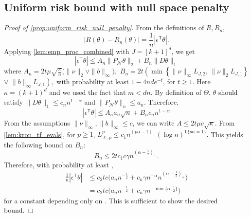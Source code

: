 \documentclass[ejs,noshowframe]{imsart}
\theoremstyle{plain}
\theoremstyle{definition}
\newcommand{\cN}{\mathcal{N}}
\renewcommand{\top}{\mathsf{T}}
\begin{document}
\begin{appendix}
\subsection{Uniform risk bound with null space penalty}
\label{sec:app-uniform_risk_null_penalty}

\begin{proof}[Proof of \autoref{prop:uniform_risk_null_penalty}]
From the definitions of $R, R_n$, 
\begin{equation*}
|R(\theta) - R_n(\theta)| = \frac{1}{n} | \epsilon^\top \theta |.
\end{equation*}
Applying \autoref{lem:emp_proc_combined} with $J = [k+1]^d$, we get
\begin{equation*}
| \epsilon^\top \theta | \leq  A_n \|P_\cN \theta \|_2 + B_n\| D \theta \|_1 
\end{equation*}
where 
$A_n = 2t\mu \sqrt{\frac{\kappa}{n}} \big( \| \nu \|_2 \vee \|b\|_\infty\big),$
$B_n = 2t\left(\min\left\{ \|\nu\|_\infty  L_{J,2}\right.\right.$, 
$\left.\|\nu\|_2 L_{J,1} \right\}$ $\vee$
$\left.\| b \|_\infty L_{J,1}\right),$
with probability at least $1- 4nd e^{-t}$, for $t\ge 1$.
Here $\kappa = (k+1)^d$ and we used the fact that $m < dn$.
By definition of $\Theta$, $\theta$ should satisfy $\|D\theta\|_1 \le c_n 
n^{1-\alpha}$
 and $\|P_\cN \theta\|_n \le a_n$.
Therefore,
\begin{equation}
| \epsilon^\top \theta | \leq 
A_n a_n \sqrt{n} + B_n c_n n^{1-\alpha}
\end{equation}
From the assumptions $\| \nu \|_\infty, \|b\|_\infty \leq c$, we can write 
$A \leq 2 t \mu c \sqrt{\kappa}.$
From \autoref{lem:kron_tf_evals}, for $p\geq 1$,
$
L_{\ell,p}^p \leq c_1 n^{ (p\alpha - 1)_+} (\log n)^{\mathbf{1} \{p\alpha=1\} 
}.
$
This yields the following bound on $B_n:$
\begin{equation}
B_n \leq 2 t c_1 c\gamma n^{(\alpha - \frac{1}{2} )_+}.
\end{equation}
Therefore, with probability at least ,
\begin{align*}
\frac{1}{n}| \epsilon^\top \theta | 
&\leq 
c_2 t c \big( a_n n^{-\frac{1}{2}} + 
	c_n \gamma n^{-\alpha} n^{(\alpha - \frac{1}{2} )_+}  \big)\\
&= c_2 t c \big( a_n n^{-\frac{1}{2}} + 
	c_n \gamma n^{-\min\{\alpha, \frac{1}{2}\}}  \big)
\end{align*}
for a constant  depending only on .
This is sufficient to show the desired bound.
\end{proof}


\end{appendix}
\end{document}

